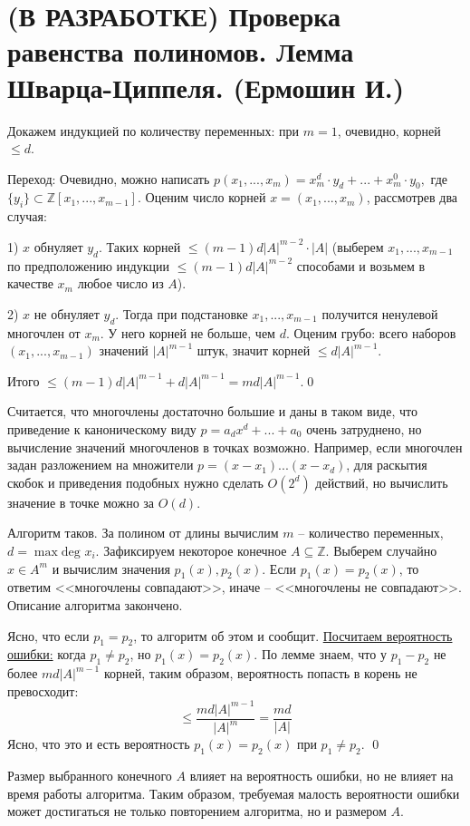 \section{(В РАЗРАБОТКЕ) Проверка равенства полиномов. Лемма Шварца-Циппеля. (Ермошин И.)}

Докажем индукцией по количеству переменных: при $m=1$, очевидно, корней $\le d$.

Переход: 
Очевидно, можно написать $p(x_1,...,x_m)=x_m^d\cdot y_d+...+x_m^0\cdot y_0,$ где $\{y_i\}\subset \mathbb Z[x_1,...,x_{m-1}]$. Оценим число корней $x = (x_1, ..., x_m)$, рассмотрев два случая:

1) $x$ обнуляет $y_d$. Таких корней $\le (m-1)d|A|^{m-2} \cdot |A|$ (выберем $x_1,...,x_{m-1}$ по предположению индукции $\le(m-1)d|A|^{m-2}$ способами и возьмем в качестве $x_m$ любое число из $A$).

2) $x$ не обнуляет $y_d$. Тогда при подстановке $x_1, ..., x_{m-1}$ получится ненулевой многочлен от $x_m$. У него корней не больше, чем $d$. Оценим грубо: всего наборов $(x_1, ..., x_{m-1})$ значений $|A|^{m-1}$ штук, значит корней $\le d|A|^{m-1}$.

Итого $\le (m-1)d|A|^{m-1}+d|A|^{m-1}=md|A|^{m-1}.$\qed


Считается, что многочлены достаточно большие и даны в таком виде, что приведение к каноническому виду $p = a_d x^d + ... + a_0$ очень затруднено, но вычисление значений многочленов в точках возможно. Например, если многочлен задан разложением на множители $p = (x-x_1)...(x-x_d)$, для раскытия скобок и приведения подобных нужно сделать $O(2^d)$ действий, но вычислить значение в точке можно за $O(d)$.

Алгоритм таков. За полином от длины вычислим $m$ -- количество переменных, $d = \max\text{deg } x_i$. Зафиксируем некоторое конечное $A \subseteq \mathbb Z$. Выберем случайно $x \in A^m$ и вычислим значения $p_1(x), p_2(x)$. Если $p_1(x) = p_2(x)$, то ответим <<многочлены совпадают>>, иначе -- <<многочлены не совпадают>>. Описание алгоритма закончено.

Ясно, что если $p_1=p_2$, то алгоритм об этом и сообщит. \underline{Посчитаем вероятность ошибки:} когда $p_1 \neq p_2$, но $p_1(x) = p_2(x)$. По лемме знаем, что у $p_1-p_2$ не более $md|A|^{m-1}$ корней, таким образом, вероятность попасть в корень не превосходит: $$\leq \frac{md|A|^{m-1}}{|A|^m} = \frac{md}{|A|}$$ Ясно, что это и есть вероятность $p_1(x)=p_2(x)$ при $p_1 \neq p_2$. \qed

 Размер выбранного конечного $A$ влияет на вероятность ошибки, но не влияет на время работы алгоритма. Таким образом, требуемая малость вероятности ошибки может достигаться не только повторением алгоритма, но и размером $A$.